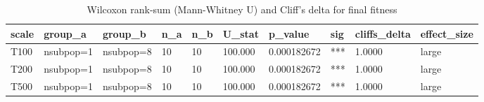 \begin{table}[htbp]
\centering
\caption{Wilcoxon rank-sum (Mann-Whitney U) and Cliff's delta for final fitness}
\label{tab:nsubpop_wilcoxon}
\begin{tabular}{llllllllll}
\toprule
scale & group_a & group_b & n_a & n_b & U_stat & p_value & sig & cliffs_delta & effect_size \\
\midrule
T100 & nsubpop=1 & nsubpop=8 & 10 & 10 & 100.000 & 0.000182672 & *** & 1.0000 & large \\
T200 & nsubpop=1 & nsubpop=8 & 10 & 10 & 100.000 & 0.000182672 & *** & 1.0000 & large \\
T500 & nsubpop=1 & nsubpop=8 & 10 & 10 & 100.000 & 0.000182672 & *** & 1.0000 & large \\
\bottomrule
\end{tabular}
\end{table}
